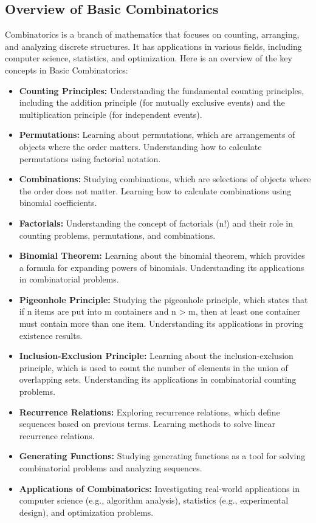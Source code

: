\documentclass[openany]{book}
\begin{document}
\subsection{Overview of Basic Combinatorics}
Combinatorics is a branch of mathematics that focuses on counting, arranging, and analyzing discrete structures. It has applications in various fields, including computer science, statistics, and optimization. Here is an overview of the key concepts in Basic Combinatorics:
\begin{itemize}
    \item \textbf{Counting Principles:} Understanding the fundamental counting principles, including the addition principle (for mutually exclusive events) and the multiplication principle (for independent events).
    \item \textbf{Permutations:} Learning about permutations, which are arrangements of objects where the order matters. Understanding how to calculate permutations using factorial notation.
    \item \textbf{Combinations:} Studying combinations, which are selections of objects where the order does not matter. Learning how to calculate combinations using binomial coefficients.
    \item \textbf{Factorials:} Understanding the concept of factorials (n!) and their role in counting problems, permutations, and combinations.
    \item \textbf{Binomial Theorem:} Learning about the binomial theorem, which provides a formula for expanding powers of binomials. Understanding its applications in combinatorial problems.
    \item \textbf{Pigeonhole Principle:} Studying the pigeonhole principle, which states that if n items are put into m containers and n > m, then at least one container must contain more than one item. Understanding its applications in proving existence results.
    \item \textbf{Inclusion-Exclusion Principle:} Learning about the inclusion-exclusion principle, which is used to count the number of elements in the union of overlapping sets. Understanding its applications in combinatorial counting problems.
    \item \textbf{Recurrence Relations:} Exploring recurrence relations, which define sequences based on previous terms. Learning methods to solve linear recurrence relations.
    \item \textbf{Generating Functions:} Studying generating functions as a tool for solving combinatorial problems and analyzing sequences.
    \item \textbf{Applications of Combinatorics:} Investigating real-world applications in computer science (e.g., algorithm analysis), statistics (e.g., experimental design), and optimization problems.
\end{itemize}
\end{document}
